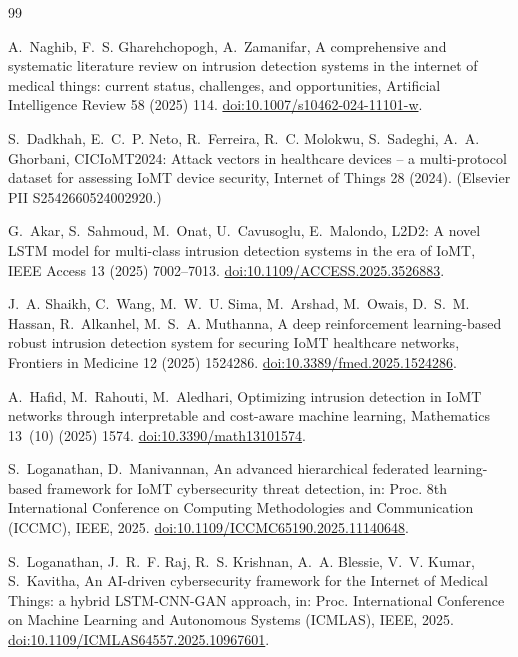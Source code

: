 \documentclass[preprint,12pt]{elsarticle}
\begin{document}
\begin{thebibliography}{99}
\small\raggedright
{} A.~Naghib, F.~S. Gharehchopogh, A.~Zamanifar, A comprehensive and systematic literature review on intrusion detection systems in the internet of medical things: current status, challenges, and opportunities, Artificial Intelligence Review 58 (2025) 114. \href{https://doi.org/10.1007/s10462-024-11101-w}{doi:10.1007/s10462-024-11101-w}.

 S.~Dadkhah, E.~C.~P. Neto, R.~Ferreira, R.~C. Molokwu, S.~Sadeghi, A.~A. Ghorbani, CICIoMT2024: Attack vectors in healthcare devices -- a multi-protocol dataset for assessing IoMT device security, Internet of Things 28 (2024). (Elsevier PII S2542660524002920.) %

 G.~Akar, S.~Sahmoud, M.~Onat, U.~Cavusoglu, E.~Malondo, L2D2: A novel LSTM model for multi-class intrusion detection systems in the era of IoMT, IEEE Access 13 (2025) 7002--7013. \href{https://doi.org/10.1109/ACCESS.2025.3526883}{doi:10.1109/ACCESS.2025.3526883}.

 J.~A. Shaikh, C.~Wang, M.~W.~U. Sima, M.~Arshad, M.~Owais, D.~S.~M. Hassan, R.~Alkanhel, M.~S.~A. Muthanna, A deep reinforcement learning-based robust intrusion detection system for securing IoMT healthcare networks, Frontiers in Medicine 12 (2025) 1524286. \href{https://doi.org/10.3389/fmed.2025.1524286}{doi:10.3389/fmed.2025.1524286}.

 A.~Hafid, M.~Rahouti, M.~Aledhari, Optimizing intrusion detection in IoMT networks through interpretable and cost-aware machine learning, Mathematics 13~(10) (2025) 1574. \href{https://doi.org/10.3390/math13101574}{doi:10.3390/math13101574}.

 S.~Loganathan, D.~Manivannan, An advanced hierarchical federated learning-based framework for IoMT cybersecurity threat detection, in: Proc. 8th International Conference on Computing Methodologies and Communication (ICCMC), IEEE, 2025. \href{https://doi.org/10.1109/ICCMC65190.2025.11140648}{doi:10.1109/ICCMC65190.2025.11140648}.

 S.~Loganathan, J.~R.~F. Raj, R.~S. Krishnan, A.~A. Blessie, V.~V. Kumar, S.~Kavitha, An AI-driven cybersecurity framework for the Internet of Medical Things: a hybrid LSTM-CNN-GAN approach, in: Proc. International Conference on Machine Learning and Autonomous Systems (ICMLAS), IEEE, 2025. \href{https://doi.org/10.1109/ICMLAS64557.2025.10967601}{doi:10.1109/ICMLAS64557.2025.10967601}.


\end{thebibliography}
\end{document}
